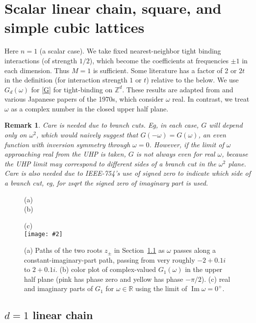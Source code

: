 \documentclass[11pt]{article}
\newcommand{\bfi}{\begin{figure}}
\newcommand{\efi}{\end{figure}}
\newcommand{\ca}[2]{\caption{#1 \label{#2}}}
\newcommand{\ig}[2]{\texttt{[image: \#2]}}
\newcommand{\bmp}[1]{\begin{minipage}{#1}}
\newcommand{\emp}{\end{minipage}}
\newcommand{\R}{\mathbb{R}}
\newcommand{\Z}{\mathbb{Z}}
\DeclareMathOperator{\im}{Im}
\newtheorem{rmk}[thm]{Remark}
\newcommand{\om}{\omega}
\begin{document}
\section{Scalar linear chain, square, and simple cubic lattices}

Here $n=1$ (a scalar case). We take fixed
nearest-neighbor tight binding interactions (of strength $1/2$), which become
the coefficients at frequencies $\pm 1$ in each dimension.
Thus $M=1$ is sufficient.
Some literature has
a factor of 2 or $2t$ in the definition (for interaction strength $1$ or $t$) relative to the below.
We use $G_d(\om)$ for \eqref{G} for tight-binding on $\Z^d$.
These results are adapted from \cite[Ch.~5]{economou}
and various Japanese papers of the 1970s, which consider $\om$ real.
In contrast, we treat $\om$ as a complex number in the closed
upper half plane.

\begin{rmk}
Care is needed due to branch cuts.
Eg, in each case, $G$ will depend only on $\om^2$, which would naively
suggest that $G(-\om) = G(\om)$, an even function with inversion
symmetry through $\om=0$. However, if the limit of $\om$ approaching real
from the UHP is taken, $G$ is not always even for real $\om$,
because the UHP limit may correspond to different sides of a branch cut in the $\om^2$ plane.
Care is also needed due to IEEE-754's use of signed zero to indicate
which side of a branch cut, eg, for zsqrt the signed zero of imaginary part
is used.
\end{rmk}


\bfi %
\bmp{3in}
(a)\raisebox{-1in}{\ig{width=3in}{zpaths}}    %
\\
(b)\raisebox{-1.5in}{\ig{width=3in}{1dband_cplane}}
\emp
\bmp{3.4in}
\mbox{}\hspace{10ex}(c)\\
\ig{width=3.4in}{1dband_real}
\emp
\vspace{-5ex}
\ca{(a) Paths of the two roots $z_\pm$ in Section~\ref{s:1d} as
  $\om$ passes along a constant-imaginary-part
  path, passing from very roughly $-2+0.1i$ to $2+0.1i$.
  (b) color plot of complex-valued $G_1(\om)$ in the upper half plane
  (pink has phase zero and yellow has phase $-\pi/2$).
  (c) real and imaginary parts of $G_1$ for $\om\in\R$ using the limit
  of $\im \om = 0^+$.
}{f:1d}
\efi

\subsection{$d=1$ linear chain}
\label{s:1d}
\end{document}
